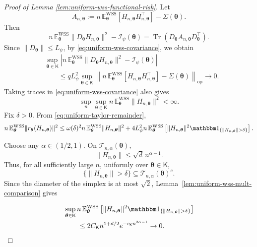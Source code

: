 \documentclass{article}
\theoremstyle{named}
\theoremstyle{named1}
\newcommand{\E}{\mathbb{E}}
\newcommand{\Tr}{\operatorname{Tr}}
\newcommand{\WSS}{\mathrm{WSS}}
\newcommand{\btheta}{\boldsymbol{\theta}}
\newcommand{\cI}{\mathcal{I}}
\theoremstyle{plain}
\theoremstyle{remark}
\begin{document}
\begin{proof}[Proof of Lemma \ref{lem:uniform-wss-functional-risk}]
Let
\[
A_{n,\btheta}
:=
n\,\E_{\btheta}^{\WSS}
[H_{n,\btheta}H_{n,\btheta}^\top]
-\Sigma(\btheta).
\]
Then
\[
n\,\E_{\btheta}^{\WSS}
\|D_{\btheta}H_{n,\btheta}\|^2
-\cI_\psi(\btheta)
=
\Tr\!\left(
D_{\btheta}A_{n,\btheta}D_{\btheta}^\top
\right).
\]
Since
$\|D_{\btheta}\|\le L_\psi$, 
by \eqref{eq:uniform-wss-covariance}, we obtain
\begin{align}
&\sup_{\btheta\in\mathsf K}
\left|
 n\,\E_{\btheta}^{\WSS}
   \|D_{\btheta}H_{n,\btheta}\|^2
 -\cI_\psi(\btheta)
\right|\nonumber\\
&\qquad\leq
 qL_\psi^2
 \sup_{\btheta\in\mathsf K}
 \left\|
 n\,\E_{\btheta}^{\WSS}
 [H_{n,\btheta}H_{n,\btheta}^\top]
 -\Sigma(\btheta)
 \right\|_{\mathrm{op}}
 \rightarrow 0.\label{eq:uniform-linear-risk}
\end{align}
Taking traces in \eqref{eq:uniform-wss-covariance} also gives
\begin{equation}
    \sup_n\sup_{\btheta\in\mathsf K}
      n\,\E_{\btheta}^{\WSS}\|H_{n,\btheta}\|^2<\infty.
\label{eq:uniform-second-moment-bound}
\end{equation}
Fix \(\delta>0\). From \eqref{eq:uniform-taylor-remainder},
\begin{equation}
n\,\E_{\btheta}^{\WSS}
  \|r_{\btheta}(H_{n,\btheta})\|^2
\leq
 \omega(\delta)^2n\,\E_{\btheta}^{\WSS}
   \|H_{n,\btheta}\|^2
 +4L_\psi^2n\,\E_{\btheta}^{\WSS}
 \left[
   \|H_{n,\btheta}\|^2
   \mathbbm1_{\{\|H_{n,\btheta}\|>\delta\}}
 \right]. \label{eq:uniform-remainder-split}
\end{equation}


Choose any \(\alpha\in(1/2,1)\). On
\(\mathcal T_{n,\alpha}(\btheta)\),
\[
    \|H_{n,\btheta}\|\leq\sqrt d\,n^{\alpha-1}.
\]
Thus, for all sufficiently large \(n\), uniformly over
\(\btheta\in\mathsf K\),
\[
    \{\|H_{n,\btheta}\|>\delta\}
    \subseteq\mathcal T_{n,\alpha}(\btheta)^c.
\]
Since the diameter of the simplex is at most \(\sqrt2\),
Lemma~\ref{lem:uniform-wss-mult-comparison} gives

\begin{align}
&\sup_{\btheta\in\mathsf K}
 n\,\E_{\btheta}^{\WSS}
 \left[
   \|H_{n,\btheta}\|^2
   \mathbbm1_{\{\|H_{n,\btheta}\|>\delta\}}
 \right]\nonumber\\
&\qquad\leq
 2C_{\mathsf K}n^{1+d/2}
 e^{-c_{\mathsf K}n^{2\alpha-1}}
 \rightarrow0. \label{eq:uniform-large-remainder}
\end{align}



\end{proof}
\end{document}
